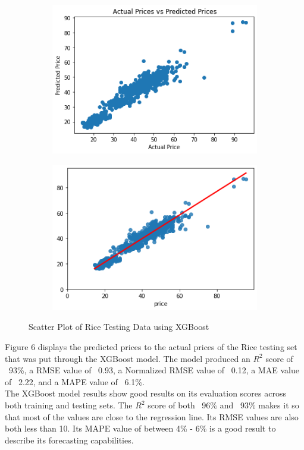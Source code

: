 \documentclass[runningheads]{llncs}
\begin{document}
\begin{figure}
	\begin{subfigure}{.5\textwidth}
		\centering
		\includegraphics[width=.8\linewidth]{FIGURES/xgb_test1.png}
		
	\end{subfigure}%
	\begin{subfigure}{.5\textwidth}
		\centering
		\includegraphics[width=.8\linewidth]{FIGURES/xgb_test2.png}
		
	\end{subfigure}
	\caption{Scatter Plot of Rice Testing Data using XGBoost}
\end{figure}

Figure 6 displays the predicted prices to the actual prices of the Rice testing set that was put through the XGBoost model. The model produced an $R^2$ score of ~93\%, a RMSE value of ~0.93, a Normalized RMSE value of ~0.12, a MAE value of ~2.22, and a MAPE value of ~6.1\%. \\

The XGBoost model results show good results on its evaluation scores across both training and testing sets. The $R^2$ score of both ~96\% and ~93\% makes it so that most of the values are close to the regression line. Its RMSE values are also both less than 10. Its MAPE value of between 4\% - 6\% is a good result to describe its forecasting capabilities.\\
\end{document}
